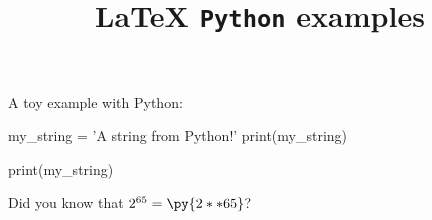 \documentclass[a4paper,12pt]{article}
\begin{document}
\title{\textbf{\LaTeX{}  \texttt{Python} examples}}
\date{}

\maketitle

A toy example with Python:
\begin{pycode}
my_string = 'A string from Python!'
print(my_string)
\end{pycode}

\begin{pyblock}
print(my_string)
\end{pyblock}
\begin{quotation}
\printpythontex
\end{quotation}

Did you know that $2^{65} = \py{2**65}$?
\end{document}
